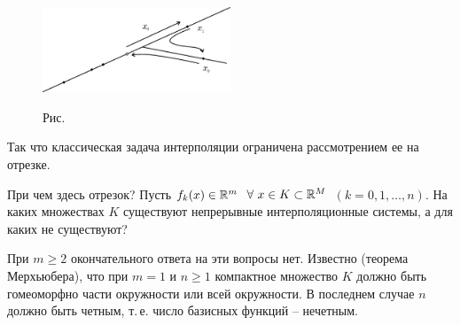  \bigskip
\begin{figure}[h]
\begin{center}
\includegraphics[width=0.5\textwidth]{pict01-6.eps}
\end{center}
 \bigskip
 \label{r1-6}

 \centerline{Рис.~\theris}
 \bigskip
\end{figure}



\noindent
Так что классическая задача интерполяции ограничена
рассмотрением ее на отрезке.

\begin{task}
При чем здесь отрезок? Пусть {$f_k(x) \in \mathbb{R}^m$}\  $\forall\ x \in K \subset
\mathbb{R}^M$\ {$(k=0,1,\ldots,n).$} На каких множествах $K$ существуют
непрерывные интерполяционные системы, а для каких не существуют?
\end{task}

При $m \ge 2$ окончательного ответа на эти вопросы нет. Известно (теорема
Мерхьюбера), что при $m=1$ и $n \ge 1$ компактное множество $K$ должно быть гомеоморфно
части
{окружности или всей окружности.
В последнем случае $n$ должно быть четным, т.\,е.} {число базисных функций -- нечетным.
}
